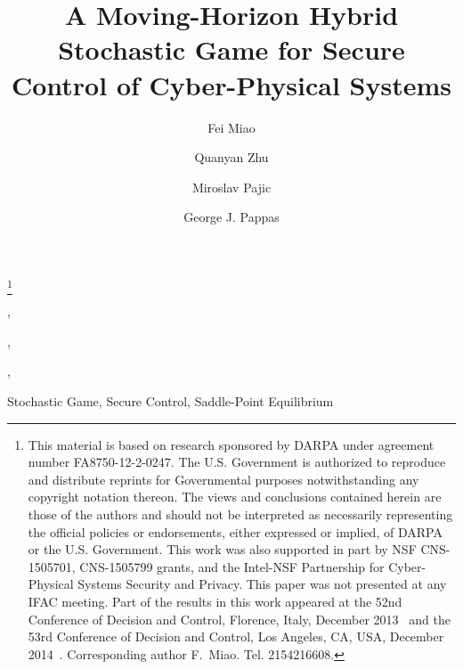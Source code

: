 \documentclass[twocolumn]{autart}  %
\begin{document}
\begin{frontmatter}
\title{A Moving-Horizon Hybrid Stochastic Game for Secure Control of Cyber-Physical Systems} %

\thanks[footnoteinfo]{This material is based on research sponsored by DARPA under agreement number FA8750-12-2-0247.  The U.S. Government is authorized to reproduce and distribute reprints for Governmental purposes notwithstanding any copyright notation thereon.  The views and conclusions contained herein are those of the authors and should not be interpreted as necessarily representing the official policies or endorsements, either expressed or implied, of DARPA or the U.S. Government. This work was also supported in part by NSF CNS-1505701, CNS-1505799 grants, and the Intel-NSF Partnership for Cyber-Physical Systems Security and Privacy. This paper was not presented at any IFAC meeting. Part of the results in this work appeared at the 52nd Conference of Decision and Control, Florence, Italy, December 2013~\cite{cdc_replay} and the 53rd Conference of Decision and Control, Los Angeles, CA, USA, December 2014~\cite{game_cdc14}. Corresponding author F.~Miao. Tel. 2154216608.}

\author[Uconn]{Fei Miao},  %
\author[NYU]{Quanyan Zhu},               %
\author[Duke]{Miroslav Pajic},  %
\author[Upenn]{George J. Pappas}

\address[Uconn]{ University of Connecticut, Storrs, CT, USA}
\address[Upenn]{ University of Pennsylvania, Philadelphia, PA, USA}  %
\address[NYU]{ New York University, Brooklyn, NY, USA}             %
\address[Duke]{Duke University, Durham, NC, USA}

\begin{keyword}
Stochastic Game, Secure Control, Saddle-Point Equilibrium
\end{keyword}


\end{frontmatter}
\end{document}
